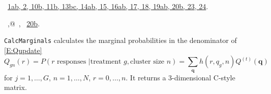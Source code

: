 \documentclass[reqno]{amsart}
\renewcommand{\NWlink}[2]{\hyperlink{#1}{#2}}
\newcommand{\bq}{\mathbf{q}}
\begin{document}
\begin{flushleft}
\begin{list}{}{\setlength{\itemsep}{-\parsep}\setlength{\itemindent}{-\leftmargin}}
\item \NWtxtFileDefBy\ \NWlink{nuweb1a}{1a}\NWlink{nuweb1b}{b}\NWlink{nuweb2}{, 2}\NWlink{nuweb10b}{, 10b}\NWlink{nuweb11b}{, 11b}\NWlink{nuweb13b}{, 13b}\NWlink{nuweb13c}{c}\NWlink{nuweb14a}{, 14a}\NWlink{nuweb14b}{b}\NWlink{nuweb15}{, 15}\NWlink{nuweb16a}{, 16a}\NWlink{nuweb16b}{b}\NWlink{nuweb17}{, 17}\NWlink{nuweb18}{, 18}\NWlink{nuweb19a}{, 19a}\NWlink{nuweb19b}{b}\NWlink{nuweb20b}{, 20b}\NWlink{nuweb23}{, 23}\NWlink{nuweb24}{, 24}.
\item \NWtxtIdentsDefed\nobreak\  \verb@IndexVector,@\nobreak\ \NWtxtIdentsNotUsed, \verb@IndexVectorC@\nobreak\ \NWlink{nuweb20b}{20b}.
\item{}
\end{list}
\vspace{4ex}
\end{flushleft}
\texttt{CalcMarginals} calculates the marginal probabilities in the denominator
of \eqref{E:Qupdate}
\begin{equation}
 Q_{gn}(r)= P(r \text{ responses } | \text{treatment }g, \text{cluster size }n)=
 \sum_\bq h(r,q_g,n) Q^{(t)}(\bq)
\end{equation}
for $j=1,\ldots, G$, $n=1,\ldots, N$, $r=0,\ldots,n$. It returns a 3-dimensional 
C-style matrix.
\end{document}
